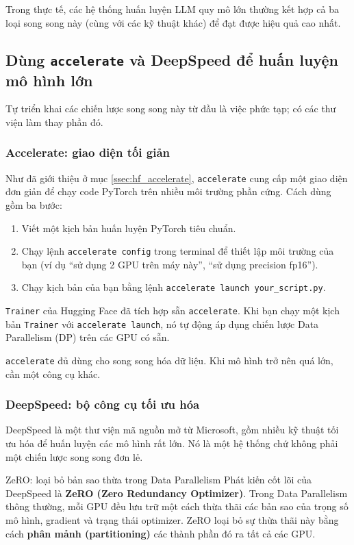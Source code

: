 Trong thực tế, các hệ thống huấn luyện LLM quy mô lớn thường kết hợp cả ba loại song song này (cùng với các kỹ thuật khác) để đạt được hiệu quả cao nhất.

\subsection{Dùng \texttt{accelerate} và DeepSpeed để huấn luyện mô hình lớn}
\label{ssec:accelerate_deepspeed}
Tự triển khai các chiến lược song song này từ đầu là việc phức tạp; có các thư viện làm thay phần đó.

\subsubsection{Accelerate: giao diện tối giản}
Như đã giới thiệu ở mục \ref{ssec:hf_accelerate}, \texttt{accelerate} cung cấp một giao diện đơn giản để chạy code PyTorch trên nhiều môi trường phần cứng. Cách dùng gồm ba bước:
\begin{enumerate}
    \item Viết một kịch bản huấn luyện PyTorch tiêu chuẩn.
    \item Chạy lệnh \texttt{accelerate config} trong terminal để thiết lập môi trường của bạn (ví dụ “sử dụng 2 GPU trên máy này”, “sử dụng precision fp16”).
    \item Chạy kịch bản của bạn bằng lệnh \texttt{accelerate launch your\_script.py}.
\end{enumerate}
\texttt{Trainer} của Hugging Face đã tích hợp sẵn \texttt{accelerate}. Khi bạn chạy một kịch bản \texttt{Trainer} với \texttt{accelerate launch}, nó tự động áp dụng chiến lược Data Parallelism (DP) trên các GPU có sẵn.

\texttt{accelerate} đủ dùng cho song song hóa dữ liệu. Khi mô hình trở nên quá lớn, cần một công cụ khác.

\subsubsection{DeepSpeed: bộ công cụ tối ưu hóa}
DeepSpeed là một thư viện mã nguồn mở từ Microsoft, gồm nhiều kỹ thuật tối ưu hóa để huấn luyện các mô hình rất lớn. Nó là một hệ thống chứ không phải một chiến lược song song đơn lẻ.

\begin{keyidea}{ZeRO: loại bỏ bản sao thừa trong Data Parallelism}
Phát kiến cốt lõi của DeepSpeed là \textbf{ZeRO (Zero Redundancy Optimizer)}. Trong Data Parallelism thông thường, mỗi GPU đều lưu trữ một cách thừa thãi các bản sao của trọng số mô hình, gradient và trạng thái optimizer. ZeRO loại bỏ sự thừa thãi này bằng cách \textbf{phân mảnh (partitioning)} các thành phần đó ra tất cả các GPU.
\end{keyidea}

